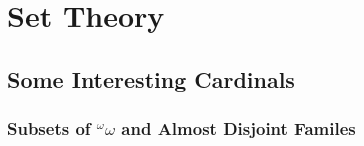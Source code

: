 \documentclass{article}
\begin{document}
\section{Set Theory}

\subsection{Some Interesting Cardinals}
\subsubsection{Subsets of $^\omega\omega$ and Almost Disjoint Familes}
\end{document}
